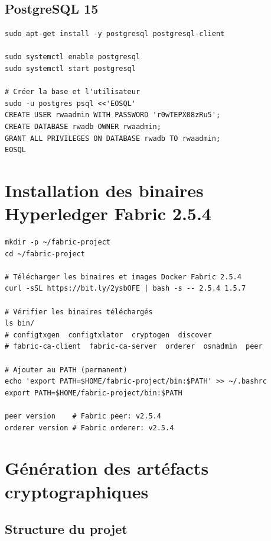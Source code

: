 \documentclass[12pt,a4paper,french]{article}
\begin{document}
\subsection{PostgreSQL 15}

\begin{lstlisting}[style=bash, caption={Installation et configuration PostgreSQL}]
sudo apt-get install -y postgresql postgresql-client

sudo systemctl enable postgresql
sudo systemctl start postgresql

# Créer la base et l'utilisateur
sudo -u postgres psql <<'EOSQL'
CREATE USER rwaadmin WITH PASSWORD 'r0wTEPX08zRu5';
CREATE DATABASE rwadb OWNER rwaadmin;
GRANT ALL PRIVILEGES ON DATABASE rwadb TO rwaadmin;
EOSQL
\end{lstlisting}

\section{Installation des binaires Hyperledger Fabric 2.5.4}

\begin{lstlisting}[style=bash, caption={Téléchargement des binaires Fabric}]
mkdir -p ~/fabric-project
cd ~/fabric-project

# Télécharger les binaires et images Docker Fabric 2.5.4
curl -sSL https://bit.ly/2ysbOFE | bash -s -- 2.5.4 1.5.7

# Vérifier les binaires téléchargés
ls bin/
# configtxgen  configtxlator  cryptogen  discover
# fabric-ca-client  fabric-ca-server  orderer  osnadmin  peer

# Ajouter au PATH (permanent)
echo 'export PATH=$HOME/fabric-project/bin:$PATH' >> ~/.bashrc
export PATH=$HOME/fabric-project/bin:$PATH

peer version    # Fabric peer: v2.5.4
orderer version # Fabric orderer: v2.5.4
\end{lstlisting}

\section{Génération des artéfacts cryptographiques}

\subsection{Structure du projet}
\end{document}
